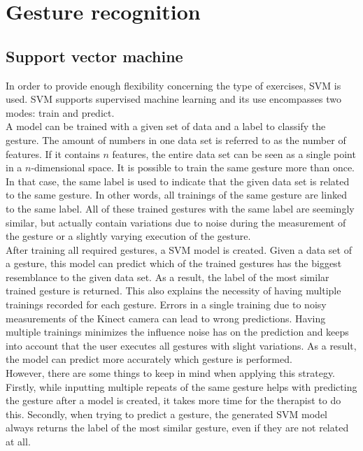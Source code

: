\section{Gesture recognition}

\subsection{Support vector machine}

In order to provide enough flexibility concerning the type of exercises, SVM is used. SVM supports supervised machine learning and its use encompasses two modes: train and predict.\\

A model can be trained with a given set of data and a label to classify the gesture. The amount of numbers in one data set is referred to as the number of features. If it contains $n$ features, the entire data set can be seen as a single point in a $n$-dimensional space. It is possible to train the same gesture more than once. In that case, the same label is used to indicate that the given data set is related to the same gesture. In other words, all trainings of the same gesture are linked to the same label. All of these trained gestures with the same label are seemingly similar, but actually contain variations due to noise during the measurement of the gesture or a slightly varying execution of the gesture.\\

After training all required gestures, a SVM model is created. Given a data set of a gesture, this model can predict which of the trained gestures has the biggest resemblance to the given data set. As a result, the label of the most similar trained gesture is returned. This also explains the necessity of having multiple trainings recorded for each gesture. Errors in a single training due to noisy measurements of the Kinect camera can lead to wrong predictions. Having multiple trainings minimizes the influence noise has on the prediction and keeps into account that the user executes all gestures with slight variations. As a result, the model can predict more accurately which gesture is performed.\\

However, there are some things to keep in mind when applying this strategy. Firstly, while inputting multiple repeats of the same gesture helps with predicting the gesture after a model is created, it takes more time for the therapist to do this. Secondly, when trying to predict a gesture, the generated SVM model always returns the label of the most similar gesture, even if they are not related at all.\\

